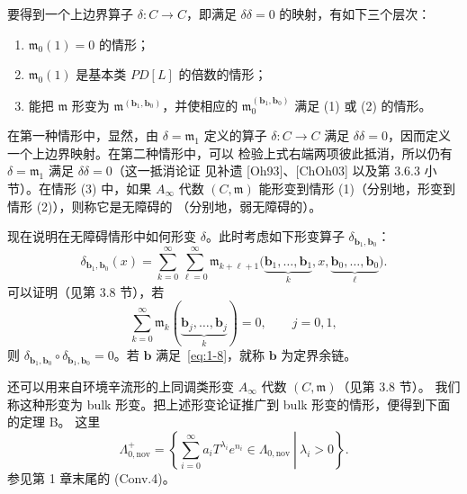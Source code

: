 要得到一个上边界算子 $\delta\colon C\to C$，即满足 $\delta\delta=0$ 的映射，有如下三个层次：
\begin{enumerate}[label=(\arabic*),leftmargin=4em]
  \item $\mathfrak m_0(1)=0$ 的情形；
  \item $\mathfrak m_0(1)$ 是基本类 $PD[L]$ 的倍数的情形；
  \item 能把 $\mathfrak m$ 形变为 $\mathfrak m^{(\mathbf b_1,\mathbf b_0)}$，并使相应的
  $\mathfrak m_0^{(\mathbf b_1,\mathbf b_0)}$ 满足 (1) 或 (2) 的情形。
\end{enumerate}
在第一种情形中，显然，由 $\delta=\mathfrak m_1$ 定义的算子
$\delta\colon C\to C$ 满足 $\delta\delta=0$，因而定义一个上边界映射。在第二种情形中，可以
检验上式右端两项彼此抵消，所以仍有 $\delta=\mathfrak m_1$ 满足 $\delta\delta=0$（这一抵消论证
见补遗 [Oh93]、[ChOh03] 以及第 3.6.3 小节）。在情形 (3) 中，如果 $A_\infty$ 代数
$(C,\mathfrak m)$ 能形变到情形 (1)（分别地，形变到情形 (2)），则称它是无障碍的
（分别地，弱无障碍的）。

现在说明在无障碍情形中如何形变 $\delta$。此时考虑如下形变算子
$\delta_{\mathbf b_1,\mathbf b_0}$：
\begin{equation}
  \delta_{\mathbf b_1,\mathbf b_0}(x)
  =\sum_{k=0}^{\infty}\sum_{\ell=0}^{\infty}
  \mathfrak m_{k+\ell+1}
  \bigl(\underbrace{\mathbf b_1,\ldots,\mathbf b_1}_{k},x,
  \underbrace{\mathbf b_0,\ldots,\mathbf b_0}_{\ell}\bigr).
  \tag{1.7}\label{eq:1-7}
\end{equation}
可以证明（见第 3.8 节），若
\begin{equation}
  \sum_{k=0}^{\infty}
  \mathfrak m_k(\underbrace{\mathbf b_j,\ldots,\mathbf b_j}_{k})=0,
  \qquad j=0,1,
  \tag{1.8}\label{eq:1-8}
\end{equation}
则 $\delta_{\mathbf b_1,\mathbf b_0}\circ\delta_{\mathbf b_1,\mathbf b_0}=0$。若 $\mathbf b$ 满足~\eqref{eq:1-8}，就称
$\mathbf b$ 为定界余链。

还可以用来自环境辛流形的上同调类形变 $A_\infty$ 代数 $(C,\mathfrak m)$（见第 3.8 节）。
我们称这种形变为 bulk 形变。把上述形变论证推广到 bulk 形变的情形，便得到下面的定理 B。
这里
\[
  \Lambda^+_{0,\mathrm{nov}}
  =\left\{
    \left.\sum_{i=0}^{\infty}a_iT^{\lambda_i}e^{n_i}
    \in\Lambda_{0,\mathrm{nov}}\ \right|\ \lambda_i>0
  \right\}.
\]
参见第 1 章末尾的 (Conv.4)。

